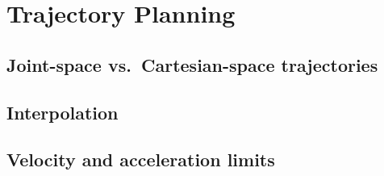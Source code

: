 \chapter{Trajectory Planning}
\label{ch:trajectory}

\section{Joint-space vs.\ Cartesian-space trajectories}

\section{Interpolation}

\section{Velocity and acceleration limits}
